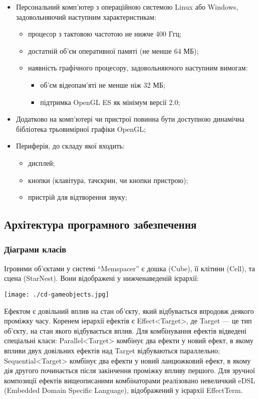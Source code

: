 \begin{itemize}
  \item Персональний комп'ютер з операційною системою Linux або Windows, задовольняючий наступним характеристикам:
  \begin{itemize}
    \item процесор з тактовою частотою не нижче 400 Ггц;
    \item достатній об'єм оперативної памяті (не менше 64 МБ);
    \item наявність графічного процесору, задовольняючого наступним вимогам:
    \begin{itemize}
      \item об'єм відеопам'яті не менше ніж 32 МБ;
      \item підтримка OpenGL ES як мінімум версії 2.0;
    \end{itemize}
  \end{itemize}
  \item Додатково на комп'ютері чи пристрої повинна бути доступною динамічна бібліотека трьовимірної графіки OpenGL;
  \item Периферія, до складу якої входить:
  \begin{itemize}
    \item дисплей;
    \item кнопки (клавітура, тачскрин, чи кнопки пристрою);
    \item пристрій для відтворення звуку;
  \end{itemize}
\end{itemize}

\subsection{Архітектура програмного забезпечення}

\subsubsection{Діаграми класів}

Ігровими об'єктами у системі ``Memspacer'' є дошка (Cube), її клітини (Cell), та сцена (StarNest). Вони відображені у нижченаведеній ієрархії:

\begin{center}
  \texttt{[image: ./cd-gameobjects.jpg]}
\end{center}

Ефектом є довільний вплив на стан об'єкту, який відбувається впродовж деякого проміжку часу. Коренем іерархії ефектів є Effect<Target>, де Target — це тип об'єкту, на стан якого відбувається вплив.
Для комбінування ефектів відведені спеціальні класи:
Parallel<Target> комбінує два ефекти у новий ефект, в якому впливи двух довільних ефектів над Target відбуваються параллельно;
Sequential<Target> комбінує два ефекти у новий ланцюжковий ефект, в якому дія другого починається після закінчення проміжку впливу першого.
	Для зручної композиції ефектів вищеописаними комбінаторами реалізовано невеличкий eDSL (Embedded Domain Specific Language), відображений у ієрархії EffectTerm.


